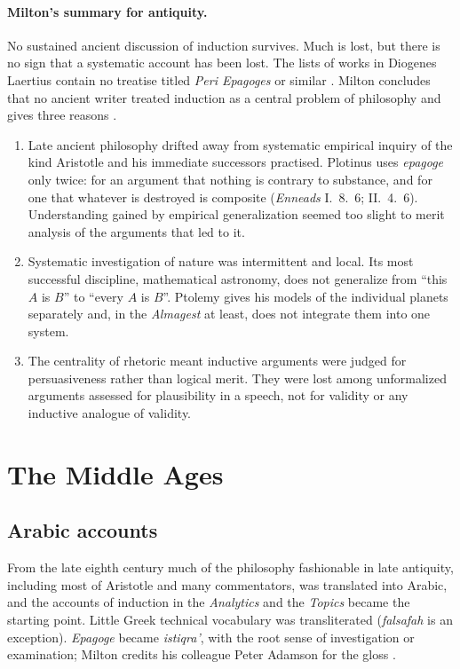 \paragraph{Milton's summary for antiquity.}
No sustained ancient discussion of induction survives. Much is lost, but
there is no sign that a systematic account has been lost. The lists of
works in Diogenes Laertius contain no treatise titled \emph{Peri Epagoges}
or similar \cite[p.~12]{Milton2011InductionBeforeHume}. Milton concludes
that no ancient writer treated induction as a central problem of
philosophy and gives three reasons \cite[pp.~12--13]{Milton2011InductionBeforeHume}.
\begin{enumerate}
\item Late ancient philosophy drifted away from systematic empirical
  inquiry of the kind Aristotle and his immediate successors practised.
  Plotinus uses \emph{epagoge} only twice: for an argument that nothing is
  contrary to substance, and for one that whatever is destroyed is
  composite (\emph{Enneads} I.~8.~6; II.~4.~6). Understanding gained by
  empirical generalization seemed too slight to merit analysis of the
  arguments that led to it.
\item Systematic investigation of nature was intermittent and local. Its
  most successful discipline, mathematical astronomy, does not generalize
  from ``this $A$ is $B$'' to ``every $A$ is $B$''. Ptolemy gives his models
  of the individual planets separately and, in the \emph{Almagest} at
  least, does not integrate them into one system.
\item The centrality of rhetoric meant inductive arguments were judged for
  persuasiveness rather than logical merit. They were lost among
  unformalized arguments assessed for plausibility in a speech, not for
  validity or any inductive analogue of validity.
\end{enumerate}

\section{The Middle Ages}
\label{sec:p15-w02b-p15-026-medieval}

\subsection{Arabic accounts}

From the late eighth century much of the philosophy fashionable in late
antiquity, including most of Aristotle and many commentators, was
translated into Arabic, and the accounts of induction in the
\emph{Analytics} and the \emph{Topics} became the starting point. Little
Greek technical vocabulary was transliterated (\emph{falsafah} is an
exception). \emph{Epagoge} became \emph{istiqra'}, with the root sense of
investigation or examination; Milton credits his colleague Peter Adamson
for the gloss \cite[p.~14]{Milton2011InductionBeforeHume}.

